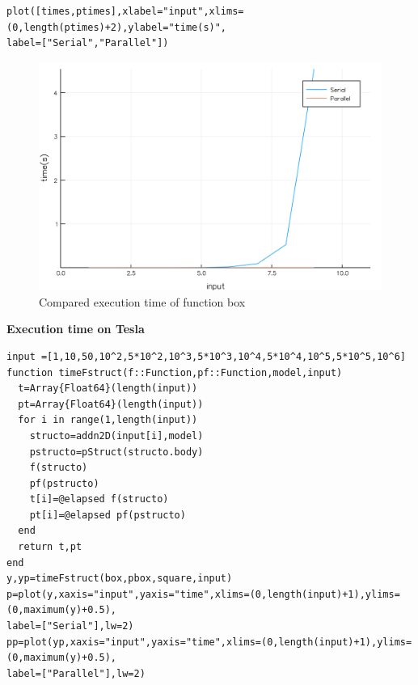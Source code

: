 \documentclass[a4paper,12pt]{article}
\begin{document}
\noindent {}
\begin{Verbatim}[fontsize=\footnotesize]
plot([times,ptimes],xlabel="input",xlims=(0,length(ptimes)+2),ylabel="time(s)",
label=["Serial","Parallel"])
\end{Verbatim}
\begin{figure}[!h]
\centering
\includegraphics[scale=0.08]{boxC.png}
\caption{Compared execution time of function box}
\end{figure}
\newpage
\noindent\textbf{Execution time on Tesla}
\begin{Verbatim}[fontsize=\footnotesize]
input =[1,10,50,10^2,5*10^2,10^3,5*10^3,10^4,5*10^4,10^5,5*10^5,10^6]
function timeFstruct(f::Function,pf::Function,model,input)
  t=Array{Float64}(length(input))
  pt=Array{Float64}(length(input))
  for i in range(1,length(input))
    structo=addn2D(input[i],model)
    pstructo=pStruct(structo.body)
    f(structo)
    pf(pstructo)
    t[i]=@elapsed f(structo)
    pt[i]=@elapsed pf(pstructo)
  end
  return t,pt
end
y,yp=timeFstruct(box,pbox,square,input)
p=plot(y,xaxis="input",yaxis="time",xlims=(0,length(input)+1),ylims=(0,maximum(y)+0.5),
label=["Serial"],lw=2)
pp=plot(yp,xaxis="input",yaxis="time",xlims=(0,length(input)+1),ylims=(0,maximum(y)+0.5),
label=["Parallel"],lw=2)
\end{Verbatim}
\end{document}
